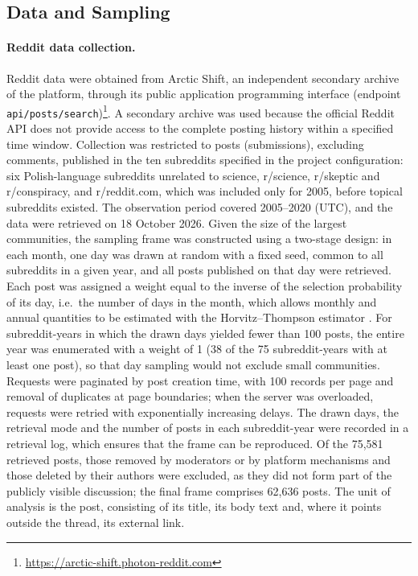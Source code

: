 \documentclass[10pt,a4paper]{article}
\newcommand{\kod}[1]{\texttt{#1}}
\begin{document}
\subsection{Data and Sampling}
\label{sec:data}

\paragraph{Reddit data collection.}
Reddit data were obtained from Arctic Shift, an independent secondary archive of the
platform, through its public application programming interface (endpoint
\kod{api/posts/search})\footnote{\url{https://arctic-shift.photon-reddit.com}}. A secondary
archive was used because the official Reddit API does not provide access to the complete
posting history within a specified time window. Collection was restricted to posts
(submissions), excluding comments, published in the ten subreddits specified in the
project configuration: six Polish-language subreddits unrelated to science, r/science,
r/skeptic and r/conspiracy, and r/reddit.com, which was included only for 2005, before
topical subreddits existed. The observation period covered 2005--2020 (UTC), and the data
were retrieved on 18 October 2026. Given the size of the largest communities, the sampling
frame was constructed using a two-stage design: in each month, one day was drawn at random
with a fixed seed, common to all subreddits in a given year, and all posts published on
that day were retrieved. Each post was assigned a weight equal to the inverse of the
selection probability of its day, i.e.\ the number of days in the month, which allows
monthly and annual quantities to be estimated with the Horvitz--Thompson estimator
\cite{horvitz1952}. For subreddit-years in which the drawn days yielded fewer than 100
posts, the entire year was enumerated with a weight of 1 (38 of the 75 subreddit-years with
at least one post), so that day sampling would not exclude small communities. Requests
were paginated by post creation time, with 100 records per page and removal of duplicates
at page boundaries; when the server was overloaded, requests were retried with
exponentially increasing delays. The drawn days, the retrieval mode and the number of
posts in each subreddit-year were recorded in a retrieval log, which ensures that the
frame can be reproduced. Of the 75,581 retrieved posts, those removed by moderators or by
platform mechanisms and those deleted by their authors were excluded, as they did not
form part of the publicly visible discussion; the final frame comprises
62,636 posts. The unit of analysis is the post, consisting of its title, its
body text and, where it points outside the thread, its external link.
\end{document}
